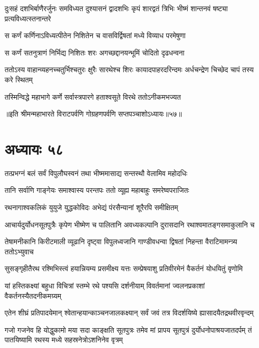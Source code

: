 \threelineshloka
{दुःसहं दशभिर्बाणैरर्जुनः समविध्यत}
{दुश्यासनं द्वादशभिः कृपं शारद्वतं त्रिभिः}
{भीष्मं शान्तनवं षष्ट्या प्रत्यविध्यत्स्तनान्तरे}


\twolineshloka
{स कर्णं कर्णिनाऽविध्यत्पीतेन निशितेन च}
{वासविर्द्विषतां मध्ये विव्याध परमेषुणा}


\twolineshloka
{स कर्णं सतनुत्राणं निर्भिद्य निशितः शरः}
{अगच्छद्दानयन्भूमिं चोदितो दृढधन्वना}


\threelineshloka
{ततोऽस्य वाहान्व्यहनच्चतुर्भिश्चतुरः क्षुरैः}
{सारथेश्च शिरः कायादपाहरदरिन्दमः}
{अर्धचन्द्रेण चिच्छेद चापं तस्य करे स्थितम्}


\twolineshloka
{तस्मिन्विद्धे महाभागे कर्णे सर्वास्त्रपारगे}
{हताश्वसूते विरथे ततोऽनीकमभज्यत}

॥इति श्रीमन्महाभारते विराटपर्वणि गोग्रहणपर्वणि सप्तपञ्चाशोऽध्यायः॥५७॥

\chapter{अध्यायः ५८}

\twolineshloka
{तत्प्रभग्नं बलं सर्वं विपुलौघस्वनं तथा}
{भीष्ममासाद्य सन्तस्थौ वेलामिव महोदधिः}


\twolineshloka
{तानि सर्वाणि गाङ्गेयः समाश्वास्य परन्तपः}
{ततो व्यूह्य महाबाहुः समरेष्वपराजितः}


\twolineshloka
{रथनागाश्वकलिकं युयुजे युद्धकोविदः}
{अभेद्यं पंरसैन्यानां शूरैरपि समीक्षितम्}


\twolineshloka
{आचार्यदुर्योधनसूतपुत्रैः कृपेण भीष्मेण च पालितानि}
{अवध्यकल्पानि दुरासदानि रथाश्वमातङ्गसमाकुलानि च}


\twolineshloka
{तेषामनीकानि किरीटमाली व्यूढानि दृष्ट्वा विपुलध्वजानि}
{गाण्डीवधन्वा द्विषतां निहन्ता वैराटिमामन्त्र्य ततोऽभ्युवाच}


\twolineshloka
{सुसङ्गृहीतैरथ रश्मिभिस्त्वं हयान्नियम्य प्रसमीक्ष्य यत्तः}
{सम्प्रेषयाशु प्रतिवीरमेनं वैकर्तनं योधयितुं वृणोमि}


\twolineshloka
{यां हस्तिकक्ष्यां बहुधा विचित्रां स्तम्भे रथे पश्यसि दर्शनीयाम्}
{विवर्तमानां ज्वलनप्रकाशां वैकर्तनस्यैतदनीकमग्र्यम्}


\twolineshloka
{एतेन शीघ्रं प्रतिपादयेमान् श्वेतान्हयान्काञ्चनजालकक्ष्यान्}
{सर्वं जवं तत्र विदर्शयिष्ये ह्यासादयैतद्रथवीरवृन्दम्}


\threelineshloka
{गजो गजनेव हि योद्धुकामो मया सदा काङ्क्षति सूतपुत्रः}
{तमेव मां प्रापय सूतपुत्रं दुर्योधनोपाश्रयजातदर्पम्}
{तं पातयिष्यामि रथस्य मध्ये सहस्रनेत्रोऽशनिनेव वृत्रम्}



